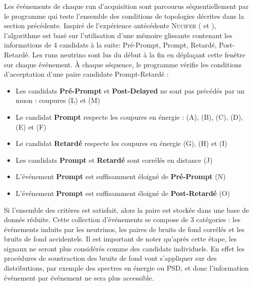 Les événements de chaque run d'acquisition sont parcourus séquentiellement par le programme qui teste l'ensemble des conditions de topologies décrites dans la section précédente. Inspiré de l'expérience antécédente \textsc{Nucifer} (\cite{pequignot:tel-01217946} et \cite{gaffiot:tel-00770675}), l'algorithme est basé sur l'utilisation d'une mémoire glissante contenant les informations de 4 candidats à la suite: Pré-Prompt, Prompt, Retardé, Post-Retardé. Les runs neutrino sont lus du début à la fin en déplaçant cette fenêtre sur chaque événement. À chaque séquence, le programme vérifie les conditions d'acceptation d'une paire candidate Prompt-Retardé :\\

\begin{itemize}
    \item Les candidats \textbf{Pré-Prompt} et \textbf{Post-Delayed} ne sont pas précédés par un muon : coupures (L) et (M)
    \item Le candidat \textbf{Prompt} respecte les coupures en énergie : (A), (B), (C), (D), (E) et (F)
    \item Le candidat \textbf{Retardé} respecte les coupures en énergie (G), (H) et (I)
    \item Les candidats \textbf{Prompt} et \textbf{Retardé} sont corrélés en distance (J)
    \item L'événement \textbf{Prompt} est suffisamment éloigné de \textbf{Pré-Prompt} (N)
    \item L'événement \textbf{Prompt} est suffisamment éloigné de \textbf{Post-Retardé} (O)
\end{itemize}

\bigbreak

Si l'ensemble des critères est satisfait, alors la paire est stockée dans une base de donnés réduite. Cette collection d'événements se compose de 3 catégories : les événements induits par les neutrinos, les paires de bruits de fond corrélés et les bruits de fond accidentels. Il est important de noter qu'après cette étape, les signaux ne seront plus considérés comme des candidats individuels. En effet les procédures de soustraction des bruits de fond vont s'appliquer sur des distributions, par exemple des spectres en énergie ou PSD, et donc l'information événement par événement ne sera plus accessible.

\bigbreak





